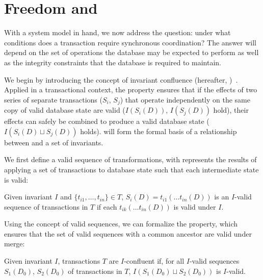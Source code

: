 
\section{Freedom and \iconfluence}
\label{sec:bcc-theory}

With a system model in hand, we now address the question: under what
conditions does a transaction require synchronous coordination? The
answer will depend on the set of operations the database may be
expected to perform as well as the integrity constraints that the
database is required to maintain.

We begin by introducing the concept of invariant confluence
(hereafter, \iconfluence)~\cite{obs-confluence}. Applied in a
transactional context, the \iconfluence property ensures that if the
effects of two series of separate transactions ($S_i$, $S_j$) that
operate independently on the same copy of valid database state are
valid ($I(S_i(D))$, $I(S_j(D))$ hold), their effects can safely be
combined to produce a valid database state ($I(S_i(D) \sqcup S_j(D))$
holds). \iconfluence will form the formal basis of a relationship
between \cfreedom and a set of invariants.

We first define a valid sequence of transformations, with represents
the results of applying a set of transactions to database state such
that each intermediate state is valid:

\begin{definition}
Given invariant $I$ and $\{t_{i1}, \dots, t_{in}\} \in T$, $S_i(D) =
t_{i1}(\dots t_{in}(D))$ is an $I$-valid sequence of transactions in
$T$ if each $t_{ik}(\dots t_{in}(D))$ is valid under $I$.
\end{definition}

Using the concept of valid sequences, we can formalize the
\iconfluence property, which ensures that the set of valid sequences
with a common ancestor are valid under merge:

\begin{definition}[\iconfluence]
Given invariant $I$, transactions $T$ are $I$-confluent if, for all
$I$-valid sequences $S_1(D_0)$, $S_2(D_0)$ of transactions in $T$,
$I(S_1(D_0) \sqcup S_2(D_0))$ is $I$-valid.
\end{definition}

